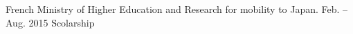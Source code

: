 \begin{cvhonors}
\cvpublication
    {}
    {French Ministry of Higher Education and Research for mobility to Japan.}
    {Feb. – Aug. 2015}
    {Scolarship}
\end{cvhonors}
